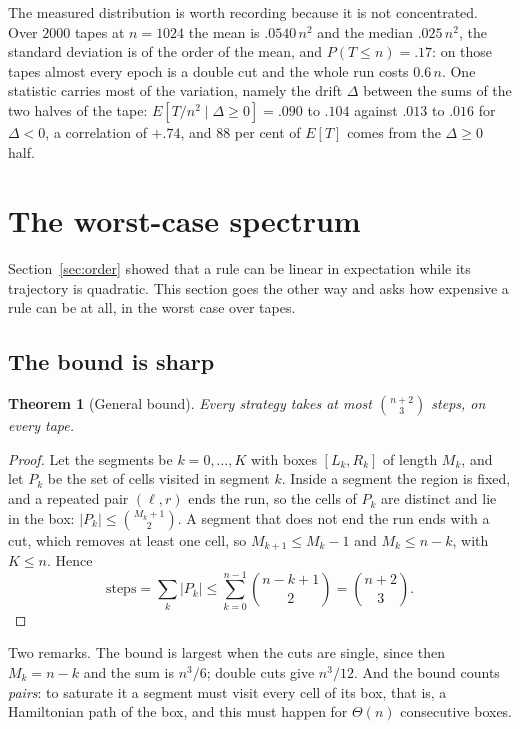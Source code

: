 \documentclass[11pt]{article}
\newtheorem{theorem}{Theorem}
\begin{document}
The measured distribution is worth recording because it is not concentrated. Over $2000$
tapes at $n=1024$ the mean is $.0540\,n^2$ and the median $.025\,n^2$, the standard deviation
is of the order of the mean, and $P(T\le n)=.17$: on those tapes almost every epoch is a
double cut and the whole run costs $0.6\,n$. One statistic carries most of the variation,
namely the drift $\Delta$ between the sums of the two halves of the tape:
$E[T/n^2\mid\Delta\ge0]=.090$ to $.104$ against $.013$ to $.016$ for $\Delta<0$, a
correlation of $+.74$, and $88$ per cent of $E[T]$ comes from the $\Delta\ge0$ half.

\section{The worst-case spectrum}\label{sec:spectrum}

Section~\ref{sec:order} showed that a rule can be linear in expectation while its trajectory
is quadratic. This section goes the other way and asks how expensive a rule can be at all,
in the worst case over tapes.

\subsection{The bound is sharp}

\begin{theorem}[General bound]\label{thm:upper2}
Every strategy takes at most $\binom{n+2}{3}$ steps, on every tape.
\end{theorem}

\begin{proof}
Let the segments be $k=0,\dots,K$ with boxes $[L_k,R_k]$ of length $M_k$, and let $P_k$ be the
set of cells visited in segment $k$. Inside a segment the region is fixed, and a repeated
pair $(\ell,r)$ ends the run, so the cells of $P_k$ are distinct and lie in the box:
$|P_k|\le\binom{M_k+1}{2}$. A segment that does not end the run ends with a cut, which
removes at least one cell, so $M_{k+1}\le M_k-1$ and $M_k\le n-k$, with $K\le n$. Hence
\[
\text{steps}=\sum_k|P_k|\le\sum_{k=0}^{n-1}\binom{n-k+1}{2}=\binom{n+2}{3}.
\]
\end{proof}

Two remarks. The bound is largest when the cuts are single, since then $M_k=n-k$ and the
sum is $n^3/6$; double cuts give $n^3/12$. And the bound counts \emph{pairs}: to saturate it
a segment must visit every cell of its box, that is, a Hamiltonian path of the box, and this
must happen for $\Theta(n)$ consecutive boxes.
\end{document}
